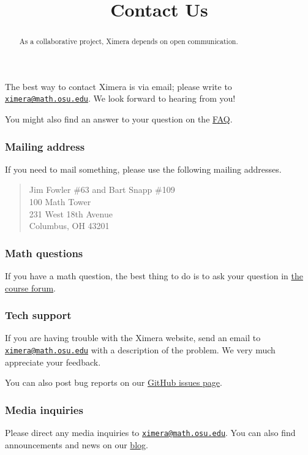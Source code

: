 \documentclass{ximera}
\title{Contact Us}
\begin{document}
\begin{abstract}
  As a collaborative project, Ximera depends on open communication.
\end{abstract}
\maketitle

The best way to contact Ximera is via email; please write to
\href{mailto:ximera@math.osu.edu}{\nolinkurl{ximera@math.osu.edu}}. We
look forward to hearing from you!

You might also find an answer to your question on the
\href{/about/faq}{FAQ}.

\subsubsection{Mailing address}

If you need to mail something, please use the following mailing
addresses.
\begin{quote}
  Jim Fowler \#63 and Bart Snapp \#109 \\
  100 Math Tower \\
  231 West 18th Avenue \\
  Columbus, OH 43201
\end{quote}

\subsubsection{Math questions}\label{math-questions}

If you have a math question, the best thing to do is to ask your
question in \href{/courses}{the course forum}.

\subsubsection{Tech support}\label{tech-support}

If you are having trouble with the Ximera website, send an email to
\href{mailto:ximera@math.osu.edu}{\nolinkurl{ximera@math.osu.edu}} with
a description of the problem. We very much appreciate your feedback.

You can also post bug reports on our
\href{https://github.com/kisonecat/ximera/issues}{GitHub issues page}.

\subsubsection{Media inquiries}\label{media-inquiries}

Please direct any media inquiries to
\href{mailto:ximera@math.osu.edu}{\nolinkurl{ximera@math.osu.edu}}. You
can also find announcements and news on our \href{/blog}{blog}.
\end{document}
